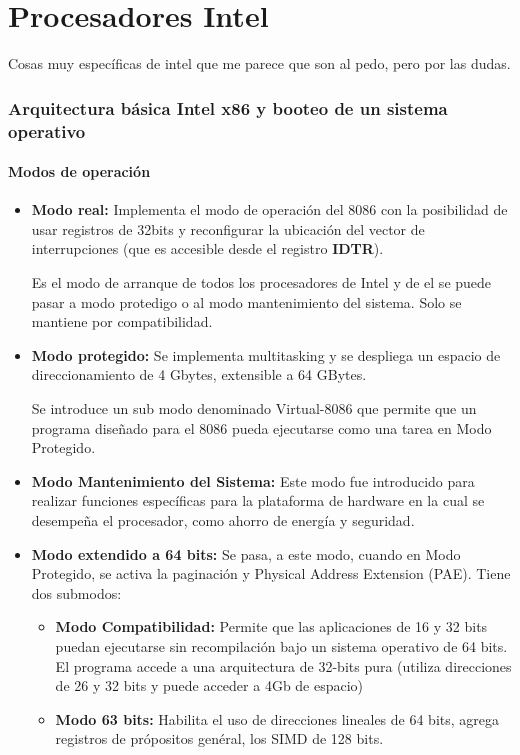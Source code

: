 \part{Procesadores Intel}
Cosas muy específicas de intel que me parece que son al pedo, pero por las dudas.

\section{Arquitectura básica Intel x86 y booteo de un sistema operativo}

\subsection{Modos de operación}
\begin{itemize}
\item\textbf{Modo real:} Implementa el modo de operación del 8086 con la posibilidad de usar registros de 32bits y reconfigurar la ubicación del vector de interrupciones (que es accesible desde el registro \textbf{IDTR}).

Es el modo de arranque de todos los procesadores de Intel y de el se puede pasar a modo protedigo o al modo mantenimiento del sistema. Solo se mantiene por compatibilidad.

\item\textbf{Modo protegido:}
Se implementa multitasking y se despliega un espacio de direccionamiento de 4 Gbytes, extensible a 64 GBytes.

Se introduce un sub modo denominado Virtual-8086 que permite que un programa diseñado para el 8086 pueda ejecutarse
como una tarea en Modo Protegido.

\item\textbf{Modo Mantenimiento del Sistema:}
Este modo fue introducido para realizar funciones específicas para la plataforma de hardware en la cual se desempeña el procesador, como ahorro de energía y seguridad.
\item\textbf{Modo extendido a 64 bits:} Se pasa, a este modo, cuando en Modo Protegido, se activa la paginación y Physical Address Extension (PAE). Tiene dos submodos:
\begin{itemize}
\item\textbf{Modo Compatibilidad:} Permite que las aplicaciones de 16 y 32 bits puedan ejecutarse sin recompilación bajo un sistema operativo de 64 bits. El programa accede a una arquitectura de 32-bits pura (utiliza direcciones de 26 y 32 bits y puede acceder a 4Gb de espacio)

\item\textbf{Modo 63 bits:} Habilita el uso de direcciones lineales de 64 bits, agrega registros de própositos genéral, los SIMD de 128 bits.
\end{itemize}

\end{itemize}

